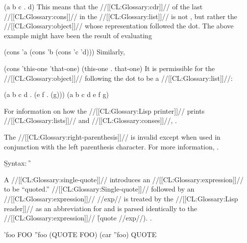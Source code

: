\code
 (a b c . d)
\endcode
This means that the //[[CL:Glossary:cdr]]// of the last //[[CL:Glossary:cons]]// in the 
//[[CL:Glossary:list]]// is not \nil,
but rather the //[[CL:Glossary:object]]// whose representation followed the dot.
The above example might have been the result of evaluating

\code
 (cons 'a (cons 'b (cons 'c 'd)))
\endcode
Similarly,

\code
 (cons 'this-one 'that-one) \EV (this-one . that-one)
\endcode
It is permissible for the //[[CL:Glossary:object]]// 
following the dot to be a //[[CL:Glossary:list]]//:

\code
 (a b c d . (e f . (g))) \EQ (a b c d e f g)
\endcode

For information on how the //[[CL:Glossary:Lisp printer]]// prints //[[CL:Glossary:lists]]// and //[[CL:Glossary:conses]]//,
\seesection\PrintingListsAndConses.

\endsubsection%

\idxcode{)}



The //[[CL:Glossary:right-parenthesis]]// is invalid 
except when used in conjunction with the left parenthesis character.
For more information, \seesection\ReaderAlgorithm.

\endsubsection%


\b{Syntax:}  \f{'}



A //[[CL:Glossary:single-quote]]// introduces an //[[CL:Glossary:expression]]// to be ``quoted.''
//[[CL:Glossary:Single-quote]]// followed by an //[[CL:Glossary:expression]]// //exp// 
is treated by the //[[CL:Glossary:Lisp reader]]// as an abbreviation for
and is parsed identically to the //[[CL:Glossary:expression]]// \f{(quote //exp//)}.
.


\code
 'foo \EV FOO
 ''foo \EV (QUOTE FOO)
 (car ''foo) \EV QUOTE
\endcode

\endsubsubsection%

\endsubsection%

\idxcode{;}


